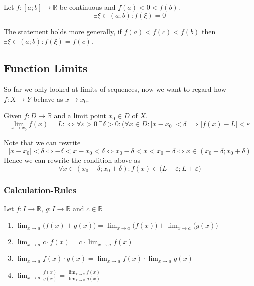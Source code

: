 \begin{theorem}\label{thm:intmd_value}
   Let \(f: [a; b] \to \mathbb{R}\) be continuous and \(f(a) < 0 < f(b)\).
   \[\exists \xi \in (a;b): f(\xi) = 0\]
\end{theorem}
\begin{remark}[Tips]
   The statement holds more generally, if \(f(a) < f(c) < f(b)\) then \(\exists \xi \in (a;b): f(\xi) = f(c)\).
\end{remark}

\subsection{Function Limits}
So far we only looked at limits of sequences, now we want to regard how \(f: X \to Y\) behave as \(x \to x_0\).

\begin{definition}\label{def:func_limit}
   Given \(f: D \to \mathbb{R}\) and a limit point \(x_0 \in D\) of \(X\).
   \[\lim_{x \to x_0} f(x) = L :\iff \forall \varepsilon > 0~\exists \delta > 0: (\forall x \in D: \lvert x - x_0 \rvert < \delta \implies \lvert f(x) - L\rvert < \varepsilon\]
\end{definition}
\begin{remark}[Intuition]
   Note that we can rewrite
   \[\lvert x - x_0\rvert < \delta \iff -\delta < x - x_0 < \delta \iff x_0 - \delta < x < x_0 + \delta \iff x \in (x_0 - \delta; x_0 + \delta)\]
   Hence we can rewrite the condition above as
   \[\forall x \in (x_0 - \delta; x_0 + \delta): f(x) \in \big(L - \varepsilon; L + \varepsilon\big)\]
\end{remark}

\begin{center}
   
\end{center}

\subsubsection{Calculation-Rules}
\begin{proposition}
   Let \(f: I \to \mathbb{R}\), \(g: I \to \mathbb{R}\) and \(c \in \mathbb{R}\)
   \begin{enumerate}[label=\roman*, align=Center]
      \item \(\lim_{x \to a}\big(f(x) \pm g(x)\big) = \lim_{x \to a}\big(f(x)\big) \pm \lim_{x \to a}\big(g(x)\big)\)
      \item \(\lim_{x \to a} c \cdot f(x) = c \cdot \lim_{x \to a} f(x)\)
      \item \(\lim_{x \to a} f(x) \cdot g(x) = \lim_{x \to a} f(x) \cdot \lim_{x \to a} g(x)\)
      \item \(\lim_{x \to a} \frac{f(x)}{g(x)} = \frac{\lim_{x \to a} f(x)}{\lim_{x \to a} g(x)}\)
   \end{enumerate}
\end{proposition}

